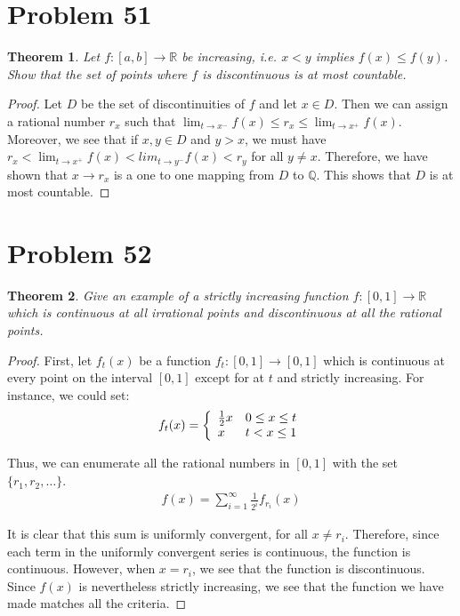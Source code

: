\documentclass[psamsfonts]{amsart}
\newtheorem{thm}{Theorem}[section]
\theoremstyle{definition}
\theoremstyle{remark}
\numberwithin{equation}{section}
\begin{document}
\section{Problem 51}

\begin{thm}
Let $f:[a,b] \to \mathbb{R}$ be increasing, i.e. $x < y$ implies $f(x) \leq f(y)$. Show that the set of points where $f$ is discontinuous is at most countable.
\end{thm}

\begin{proof}
Let $D$ be the set of discontinuities of $f$ and let $x \in D$. Then we can assign a rational number $r_x$ such that $\lim_{t \to x^{-}} f(x) \leq r_x \leq \lim_{t \to x^{+}} f(x)$. Moreover, we see that if $x,y \in D$ and $y > x$, we must have $r_x < \lim_{t \to x^{+}} f(x) < lim_{t \to y^{-}} f(x) < r_y$ for all $y \neq x$. Therefore, we have shown that $x \to r_x$ is a one to one mapping from $D$ to $\mathbb{Q}$. This shows that $D$ is at most countable. 
\end{proof}

\section{Problem 52}

\begin{thm}
Give an example of a strictly increasing function $f:[0,1] \to \mathbb{R}$ which is continuous at all irrational points and discontinuous at all the rational points.
\end{thm}

\begin{proof}
First, let $f_t(x)$ be a function $f_t: [0,1] \to [0,1]$ which is continuous at every point on the interval $[0,1]$ except for at $t$ and strictly increasing. For instance, we could set:
\begin{eqnarray}
f_t (x) = \left\{ \begin{array}{l l}
\frac{1}{2} x & 0 \leq x \leq t \\
x &t < x \leq 1
\end{array} \right.
\end{eqnarray}

Thus, we can enumerate all the rational numbers in $[0,1]$ with the set $\{ r_1, r_2, \ldots \}$. 
\begin{eqnarray}
f(x) = \sum_{i=1}^\infty \frac{1}{2^i} f_{r_i} (x)
\end{eqnarray}

It is clear that this sum is uniformly convergent, for all $x \neq r_i$. Therefore, since each term in the uniformly convergent series is continuous, the function is continuous. However, when $x = r_i$, we see that the function is discontinuous. Since $f(x)$ is nevertheless strictly increasing, we see that the function we have made matches all the criteria. 
\end{proof}
\end{document}
